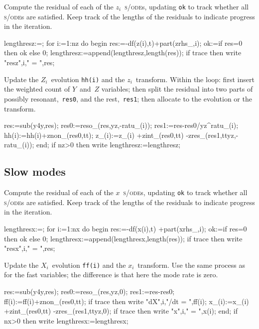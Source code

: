 \documentclass[11pt,a5paper]{article}
\def\sde{\textsc{s/ode}}
\begin{document}
Compute the residual of each of the $z_i$~\sde{}s, updating
\verb|ok| to track whether all \sde{}s are satisfied.  Keep
track of the lengths of the residuals to indicate progress
in the iteration.
\begin{reduce}
  lengthresz:={};
  for i:=1:nz do begin  
    res:=-df(z(i),t)+part(zrhs_,i);
    ok:=if res=0 then ok else 0;
    lengthresz:=append(lengthresz,{length(res)});
    if trace then write "resz",i," = ",res;
\end{reduce}
Update the $Z_i$~evolution \verb|hh(i)| and the
$z_i$~transform. Within the loop: first insert the weighted
count of $Y$~and~$Z$ variables; then split the residual into
two parts of possibly resonant,~\verb|res0|, and the
rest,~\verb|res1|; then allocate to the evolution or the
transform.
\begin{reduce}
    res:=sub(y4y,res);
    res0:=reso_(res,yz,-ratu_(i));
    res1:=res-res0/yz^ratu_(i);
    hh(i):=hh(i)+znon_(res0,tt);
    z_(i):=z_(i) +zint_(res0,tt) -zres_(res1,ttyz,-ratu_(i));
  end;
  if nz>0 then write lengthresz:=lengthresz;
\end{reduce}





\subsection{Slow modes}

Compute the residual of each of the $x$~\sde{}s, updating
\verb|ok| to track whether all \sde{}s are satisfied.  Keep
track of the lengths of the residuals to indicate progress
in the iteration.
\begin{reduce}
  lengthresx:={};
  for i:=1:nx do begin
    res:=-df(x(i),t) +part(xrhs_,i);
    ok:=if res=0 then ok else 0;
    lengthresx:=append(lengthresx,{length(res)});
    if trace then write "resx",i," = ",res;
\end{reduce}
Update the $X_i$~evolution \verb|ff(i)| and the
$x_i$~transform. Use the same process as for the fast
variables; the difference is that here the mode rate is
zero.
\begin{reduce}
    res:=sub(y4y,res);
    res0:=reso_(res,yz,0);
    res1:=res-res0;
    ff(i):=ff(i)+znon_(res0,tt);
    if trace then write "dX",i,"/dt = ",ff(i);
    x_(i):=x_(i) +zint_(res0,tt) -zres_(res1,ttyz,0);
    if trace then write "x",i," = ",x(i);
  end;
  if nx>0 then write lengthresx:=lengthresx;
\end{reduce}
\end{document}
